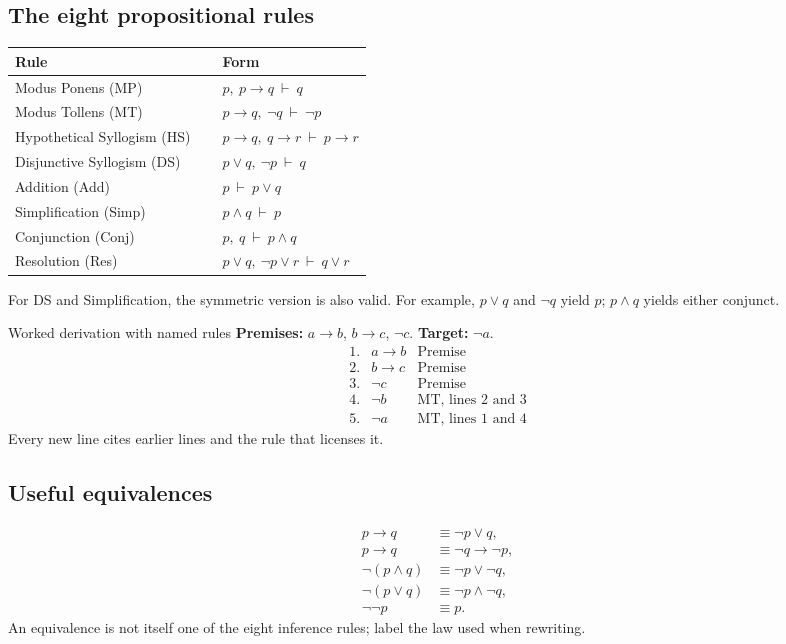 \documentclass[10pt]{article}
\begin{document}
\begin{multicols}{2}
\raggedcolumns
\subsection*{The eight propositional rules}

\begin{center}
\renewcommand{\arraystretch}{1.28}
\begin{tabularx}{\linewidth}{@{}Y>{\centering\arraybackslash}p{0.42\linewidth}@{}}
\toprule
\textbf{Rule} & \textbf{Form} \\
\midrule
Modus Ponens (MP) & $p,\ p\to q\ \vdash\ q$ \\
Modus Tollens (MT) & $p\to q,\ \neg q\ \vdash\ \neg p$ \\
Hypothetical Syllogism (HS) & $p\to q,\ q\to r\ \vdash\ p\to r$ \\
Disjunctive Syllogism (DS) & $p\lor q,\ \neg p\ \vdash\ q$ \\
Addition (Add) & $p\ \vdash\ p\lor q$ \\
Simplification (Simp) & $p\land q\ \vdash\ p$ \\
Conjunction (Conj) & $p,\ q\ \vdash\ p\land q$ \\
Resolution (Res) & $p\lor q,\ \neg p\lor r\ \vdash\ q\lor r$ \\
\bottomrule
\end{tabularx}
\end{center}

For DS and Simplification, the symmetric version is also valid. For example,
$p\lor q$ and $\neg q$ yield $p$; $p\land q$ yields either conjunct.

\begin{workedbox}{Worked derivation with named rules}
\textbf{Premises:} $a\to b$, $b\to c$, $\neg c$. \quad
\textbf{Target:} $\neg a$.
\[
\begin{array}{rll}
1.&a\to b&\text{Premise}\\
2.&b\to c&\text{Premise}\\
3.&\neg c&\text{Premise}\\
4.&\neg b&\text{MT, lines 2 and 3}\\
5.&\neg a&\text{MT, lines 1 and 4}
\end{array}
\]
Every new line cites earlier lines and the rule that licenses it.
\end{workedbox}

\subsection*{Useful equivalences}
\[
\begin{aligned}
p\to q&\equiv \neg p\lor q,\\
p\to q&\equiv \neg q\to\neg p,\\
\neg(p\land q)&\equiv\neg p\lor\neg q,\\
\neg(p\lor q)&\equiv\neg p\land\neg q,\\
\neg\neg p&\equiv p.
\end{aligned}
\]
An equivalence is not itself one of the eight inference rules; label the law
used when rewriting.


\end{multicols}
\end{document}
